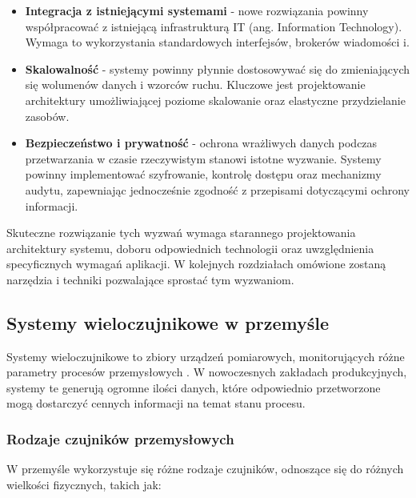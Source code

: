\begin{itemize}
    \item \textbf{Integracja z istniejącymi systemami} - nowe rozwiązania powinny współpracować z istniejącą infrastrukturą IT (ang. Information Technology). Wymaga to wykorzystania standardowych interfejsów, brokerów wiadomości i.
    
    \item \textbf{Skalowalność} - systemy powinny płynnie dostosowywać się do zmieniających się wolumenów danych i wzorców ruchu. Kluczowe jest projektowanie architektury umożliwiającej poziome skalowanie oraz elastyczne przydzielanie zasobów.
    
    \item \textbf{Bezpieczeństwo i prywatność} - ochrona wrażliwych danych podczas przetwarzania w czasie rzeczywistym stanowi istotne wyzwanie. Systemy powinny implementować szyfrowanie, kontrolę dostępu oraz mechanizmy audytu, zapewniając jednocześnie zgodność z przepisami dotyczącymi ochrony informacji.
\end{itemize}

Skuteczne rozwiązanie tych wyzwań wymaga starannego projektowania architektury systemu, doboru odpowiednich technologii oraz uwzględnienia specyficznych wymagań aplikacji. W kolejnych rozdziałach omówione zostaną narzędzia i techniki pozwalające sprostać tym wyzwaniom.

\subsection{Systemy wieloczujnikowe w przemyśle}
\label{subsec:systemy_wieloczujnikowe}

Systemy wieloczujnikowe to zbiory urządzeń pomiarowych, monitorujących różne parametry procesów przemysłowych \cite{multisensor_systems}.
W nowoczesnych zakładach produkcyjnych, systemy te generują ogromne ilości danych, które odpowiednio przetworzone mogą dostarczyć cennych informacji na temat stanu procesu.

\subsubsection{Rodzaje czujników przemysłowych}
\label{subsubsec:rodzaje_czujnikow}

W przemyśle wykorzystuje się różne rodzaje czujników, odnoszące się do różnych wielkości fizycznych, takich jak:


